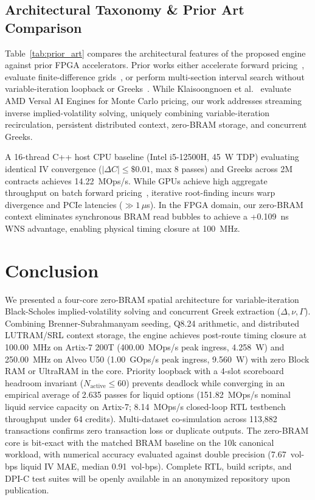 \documentclass[sigconf,anonymous,review]{acmart}
\begin{document}
\newpage
\enlargethispage{\baselineskip}
\subsection{Architectural Taxonomy \& Prior Art Comparison}
Table~\ref{tab:prior_art} compares the architectural features of the proposed engine against prior FPGA accelerators. Prior works either accelerate forward pricing~\cite{tse2010customising}, evaluate finite-difference grids~\cite{becker2011dynamic,jin2012optimising}, or perform multi-section interval search without variable-iteration loopback or Greeks~\cite{wang2022fpga}. While Klaisoongnoen et al.~\cite{klaisoongnoen2024evaluating} evaluate AMD Versal AI Engines for Monte Carlo pricing, our work addresses streaming inverse implied-volatility solving, uniquely combining variable-iteration recirculation, persistent distributed context, zero-BRAM storage, and concurrent Greeks.

A 16-thread C++ host CPU baseline (Intel i5-12500H, 45~W TDP) evaluating identical IV convergence ($|\Delta C| \le \$0.01$, max 8 passes) and Greeks across 2M contracts achieves 14.22~MOps/s. While GPUs achieve high aggregate throughput on batch forward pricing~\cite{cuda2023samples}, iterative root-finding incurs warp divergence and PCIe latencies ($\gg 1\,\mu$s). In the FPGA domain, our zero-BRAM context eliminates synchronous BRAM read bubbles to achieve a +0.109~ns WNS advantage, enabling physical timing closure at 100~MHz.

\section{Conclusion}
We presented a four-core zero-BRAM spatial architecture for variable-iteration Black-Scholes implied-volatility solving and concurrent Greek extraction ($\Delta, \nu, \Gamma$). Combining Brenner-Subrahmanyam seeding, Q8.24 arithmetic, and distributed LUTRAM/SRL context storage, the engine achieves post-route timing closure at 100.00~MHz on Artix-7 200T (400.00~MOps/s peak ingress, 4.258~W) and 250.00~MHz on Alveo U50 (1.00~GOps/s peak ingress, 9.560~W) with zero Block RAM or UltraRAM in the core. Priority loopback with a 4-slot scoreboard headroom invariant ($N_{\text{active}} \le 60$) prevents deadlock while converging in an empirical average of 2.635 passes for liquid options (151.82~MOps/s nominal liquid service capacity on Artix-7; 8.14~MOps/s closed-loop RTL testbench throughput under 64 credits). Multi-dataset co-simulation across 113,882 transactions confirms zero transaction loss or duplicate outputs. The zero-BRAM core is bit-exact with the matched BRAM baseline on the 10k canonical workload, with numerical accuracy evaluated against double precision (7.67~vol-bps liquid IV MAE, median 0.91~vol-bps). Complete RTL, build scripts, and DPI-C test suites will be openly available in an anonymized repository upon publication.
\end{document}
